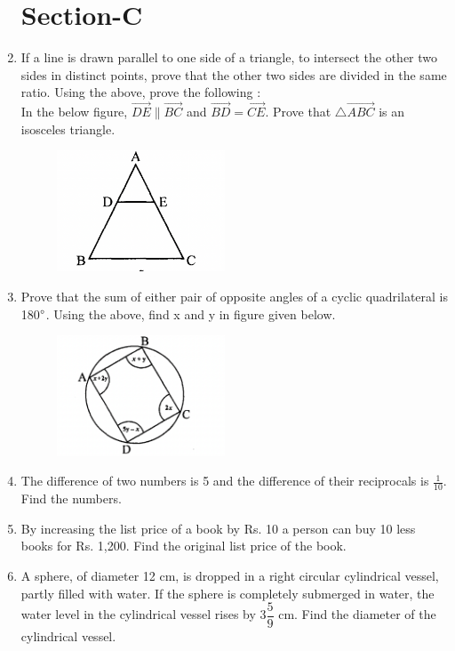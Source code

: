 \documentclass[journal,12pt,twocolumn]{IEEEtran}
\begin{document}
\begin{enumerate}
 \section{Section-C}
 \item If a line is drawn parallel to one side of a triangle, to intersect the other two sides in distinct points, prove that the other two sides are divided in the same ratio. Using the above, prove the following :\\ In the below figure, $\vec{DE} \| \vec{BC}$ and $\vec{BD}=\vec{CE}$. Prove that $\triangle\vec{ABC}$ is an isosceles triangle.
 \begin{figure}[h!]
    \centering
    \includegraphics[width=5cm]{8.png}
 \end{figure}
 \medskip
 \item Prove that the sum of either pair of opposite angles of a cyclic quadrilateral is 180$\degree$. Using the above, find x and y in figure given below.
 \begin{figure}[h!]
    \centering
    \includegraphics[width=5cm]{9.png}
 \end{figure}
 \medskip
 \item The difference of two numbers is 5 and the difference of their reciprocals is $\displaystyle\frac{1}{10}$. Find the numbers.
 \medskip
\item  By increasing the list price of a book by Rs. 10 a person can buy 10 less books for Rs. 1,200. Find the original list price of the book.
\medskip
\item A sphere, of diameter 12 cm, is dropped in a right circular cylindrical vessel, partly filled with water. If the sphere is completely submerged in water, the water level in the cylindrical vessel rises by {3}$\dfrac{5}{9}$ cm. Find the diameter of the cylindrical vessel.

\end{enumerate}
\end{document}
